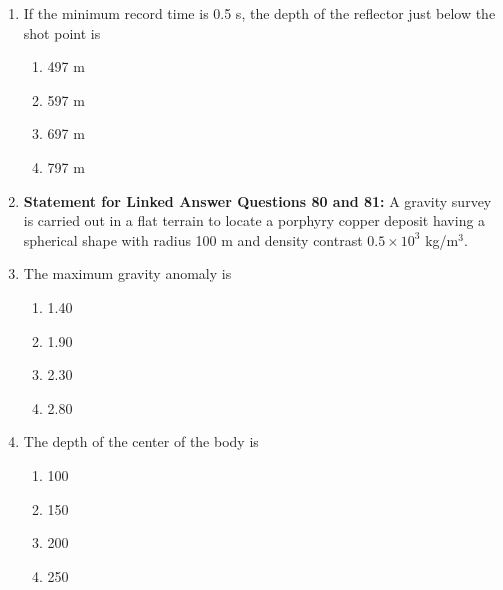 \documentclass[journal,12pt,onecolumn]{IEEEtran}
\theoremstyle{remark}
\begin{document}
\begin{enumerate}
    \item If the minimum record time is 0.5 s, the depth of the reflector just below the shot point is

    \hfill{}
    
    \begin{multicols}{4}
        \begin{enumerate}
            \item 497 m
            \item 597 m
            \item 697 m
            \item 797 m
        \end{enumerate}
    \end{multicols}

    \item[] \textbf{Statement for Linked Answer Questions 80 and 81:} A gravity survey is carried out in a flat terrain to locate a porphyry copper deposit having a spherical shape with radius 100 m and density contrast $0.5 \times 10^3$ kg/m$^3$.
    
    \item The maximum gravity anomaly  is

    \hfill{}
    
    \begin{multicols}{4}
        \begin{enumerate}
            \item 1.40
            \item 1.90
            \item 2.30
            \item 2.80
        \end{enumerate}
    \end{multicols}

\newpage

    \item The depth of the center of the body  is

    \hfill{}
    
    \begin{multicols}{4}
        \begin{enumerate}
            \item 100
            \item 150
            \item 200
            \item 250
        \end{enumerate}
    \end{multicols}


\end{enumerate}
\end{document}
